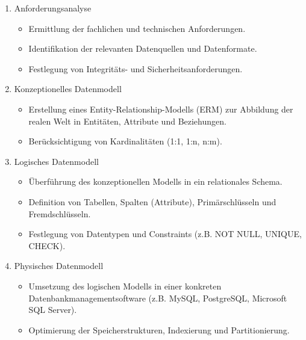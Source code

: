 \begin{enumerate}

\item
Anforderungsanalyse


\begin{itemize}

\item
Ermittlung der fachlichen und technischen Anforderungen.
\item
Identifikation der relevanten Datenquellen und Datenformate.
\item
Festlegung von Integritäts- und Sicherheitsanforderungen.

\end{itemize}

\item
Konzeptionelles Datenmodell

\begin{itemize}

\item
Erstellung eines Entity-Relationship-Modells (ERM) zur Abbildung der realen Welt in Entitäten, Attribute und Beziehungen.
\item
Berücksichtigung von Kardinalitäten (1:1, 1:n, n:m).

\end{itemize}

\item
Logisches Datenmodell

\begin{itemize}

\item
Überführung des konzeptionellen Modells in ein relationales Schema.
\item
Definition von Tabellen, Spalten (Attribute), Primärschlüsseln und Fremdschlüsseln.
\item
Festlegung von Datentypen und Constraints (z.B. NOT NULL, UNIQUE, CHECK).

\end{itemize}

\item
Physisches Datenmodell


\begin{itemize}

\item
Umsetzung des logischen Modells in einer konkreten Datenbankmanagementsoftware (z.B. MySQL, PostgreSQL, Microsoft SQL Server).
\item
Optimierung der Speicherstrukturen, Indexierung und Partitionierung.


\end{itemize}
\end{enumerate}
